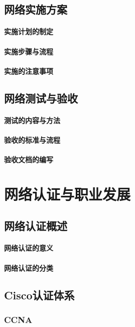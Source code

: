 \documentclass{book}
\begin{document}
\section{网络实施方案}
\subsubsection{实施计划的制定}
\subsubsection{实施步骤与流程}
\subsubsection{实施的注意事项}
\section{网络测试与验收}
\subsubsection{测试的内容与方法}
\subsubsection{验收的标准与流程}
\subsubsection{验收文档的编写}

\chapter{网络认证与职业发展}
\section{网络认证概述}
\subsubsection{网络认证的意义}
\subsubsection{网络认证的分类}
\section{Cisco认证体系}
\subsection{CCNA}
\end{document}
